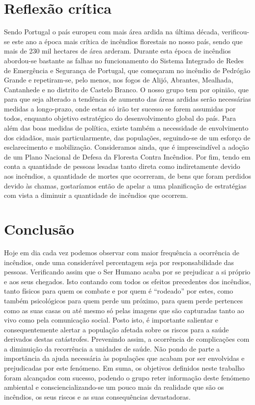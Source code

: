 \documentclass{report}
\begin{document}
\chapter{Reflexão crítica}
Sendo Portugal o país europeu com mais área ardida na última década, verificou-se este ano a época mais crítica de incêndios florestais no nosso país, sendo que mais de 230 mil hectares de área arderam.
Durante esta época de incêndios abordou-se bastante as falhas no funcionamento do Sistema Integrado de Redes de Emergência e Segurança de Portugal, que começaram no incêndio de Pedrógão Grande e repetiram-se, pelo menos, nos fogos de Alijó, Abrantes, Mealhada, Cantanhede e no distrito de Castelo Branco.
O nosso grupo tem por opinião, que para que seja alterado a tendência de aumento das áreas ardidas serão necessárias medidas a longo-prazo, onde estas só irão ter sucesso se forem assumidas por todos, enquanto objetivo estratégico do desenvolvimento global do país.
Para além das boas medidas de política, existe também a necessidade de envolvimento dos cidadãos, mais particularmente, das populações, seguindo-se de um esforço de esclarecimento e mobilização.
Consideramos ainda, que é imprescindível a adoção de um Plano Nacional de Defesa da Floresta Contra Incêndios.
Por fim, tendo em conta a quantidade de pessoas lesadas tanto direta como indiretamente devido aos incêndios, a quantidade de mortes que ocorreram, de bens que foram perdidos devido às chamas, gostaríamos então de apelar a uma planificação de estratégias com vista a diminuir a quantidade de incêndios que ocorrem. 





\chapter{Conclusão}
Hoje em dia cada vez podemos observar com maior frequência a ocorrência de incêndios, onde uma considerável percentagem seja por responsabilidade das pessoas. Verificando assim que o Ser Humano acaba por se prejudicar a si próprio e aos seus chegados. Isto contando com todos os efeitos precedentes dos incêndios, tanto físicos para quem os combate e por quem é “rodeado” por estes, como também psicológicos para quem perde um próximo, para quem perde pertences como as suas casas ou até mesmo só pelas imagens que são capturadas tanto ao vivo como pela comunicação social.
Posto isto, é importante salientar e consequentemente alertar a população afetada sobre os riscos para a saúde derivados destas catástrofes. Prevenindo assim, a ocorrência de complicações com a diminuição da recorrência a unidades de saúde. Não pondo de parte a importância da ajuda necessária às populações que acabam por ser envolvidas e prejudicadas por este fenómeno.
Em suma, os objetivos definidos neste trabalho foram alcançados com sucesso, podendo o grupo reter informação deste fenómeno ambiental e consciencializando-se um pouco mais da realidade que são os incêndios, os seus riscos e as suas consequências devastadoras.
\end{document}
